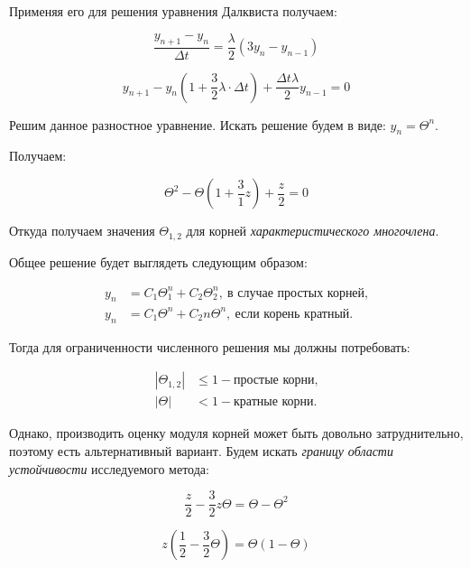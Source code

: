 \documentclass[10pt,a4paper]{article}
\begin{document}
	Применяя его для решения уравнения Далквиста получаем:
	
	\begin{equation}
		\frac{y_{n + 1} - y_{n}}{\Delta t} = \frac{\lambda}{2}\left(3y_{n} - 
		y_{n - 1}\right)
	\end{equation}

	\begin{equation}
		y_{n + 1} - y_{n}\left(1 + \frac{3}{2}\lambda\cdot\Delta t\right) + 
		\frac{\Delta t \lambda}{2}y_{n - 1}  = 0
	\end{equation}
	
	Решим данное разностное уравнение. Искать решение будем в виде: $y_{n} = 
	\Theta^{n}$.
	
	Получаем:
	
	\begin{equation}
		\Theta^{2} - \Theta\left(1 + \frac{3}{1}z\right) + \frac{z}{2} = 0
	\end{equation}
	
	Откуда получаем значения $\Theta_{1, 2}$ для корней 
	\textit{характеристического многочлена}. 
	
	Общее решение будет выглядеть следующим образом:
	
	\begin{align}
		y_{n} &= C_{1}\Theta_{1}^{n} + C_{2}\Theta^{n}_{2}, \ \text{в случае 
		простых корней,}\\
	 	y_{n} &= C_{1}\Theta^{n} + C_{2}n\Theta^{n}, \ \text{если корень 
	 	кратный.}
	\end{align}
	
	Тогда для ограниченности численного решения мы должны потребовать:
	
	\begin{align}
		\left|\Theta_{1, 2}\right|& \leqslant 1 - \text{простые корни,} \\
		\left|\Theta\right|& < 1 - \text{кратные корни.}
	\end{align}
	
	Однако, производить оценку модуля корней может быть довольно затруднительно, 
	поэтому есть альтернативный вариант. Будем искать \textit{границу области 
	устойчивости} исследуемого метода:
	
	\begin{equation}
		\frac{z}{2} - \frac{3}{2}z\Theta = \Theta - \Theta^{2}
	\end{equation}
	
	\begin{equation}
		z\left(\frac{1}{2} - \frac{3}{2}\Theta\right) = \Theta\left(1 - \Theta
		\right)
	\end{equation}
	
\end{document}
